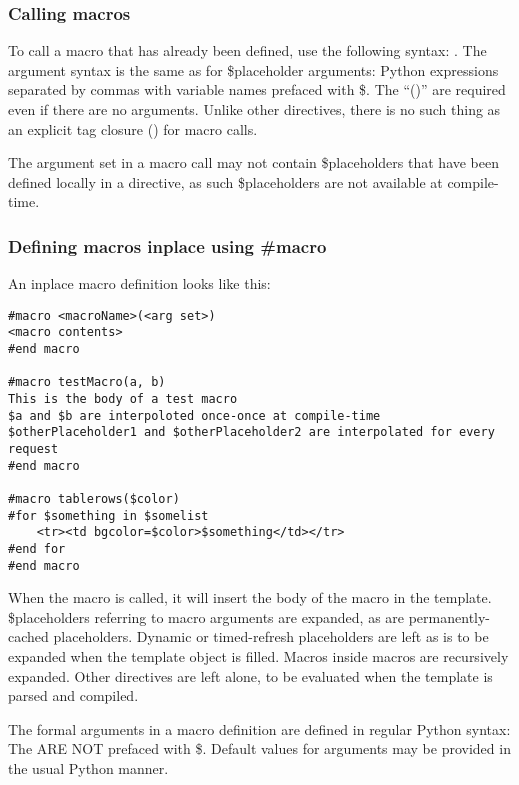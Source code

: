 \subsubsection{Calling macros}
\label{directives.macros.calling}

To call a macro that has already been defined, use the following syntax:
.  The argument syntax is the same as for
\$placeholder arguments: Python expressions separated by commas with variable
names prefaced with \$.  The ``()'' are required even if there are no arguments.
Unlike other directives, there is no such thing as an explicit tag closure
(\code{\/\#}) for macro calls.

The argument set in a macro call may not contain \$placeholders that have been
defined locally in a  directive, as such \$placeholders are not
available at compile-time.


\subsubsection{Defining macros inplace using \#macro}
\label{directives.macros.defining}

An inplace macro definition looks like this:

\begin{verbatim}
#macro <macroName>(<arg set>)
<macro contents>
#end macro

#macro testMacro(a, b)
This is the body of a test macro
$a and $b are interpoloted once-once at compile-time
$otherPlaceholder1 and $otherPlaceholder2 are interpolated for every request
#end macro

#macro tablerows($color)
#for $something in $somelist
    <tr><td bgcolor=$color>$something</td></tr>
#end for
#end macro
\end{verbatim}

When the macro is called, it will insert the body of the macro in the template.
\$placeholders referring to macro arguments are expanded, as are
permanently-cached placeholders.  Dynamic or timed-refresh placeholders are left
as is to be expanded when the template object is filled.  Macros inside macros are
recursively expanded.  Other directives are left alone, to be evaluated when the
template is parsed and compiled.

The formal arguments in a macro definition are defined in regular Python syntax:
The ARE NOT prefaced with \$.  Default values for arguments
may be provided in the usual Python manner.

